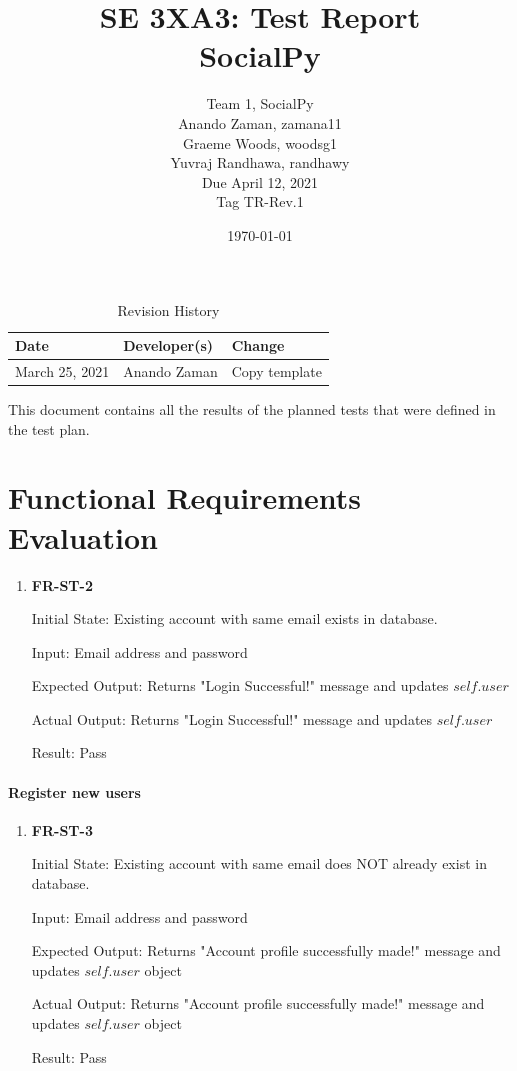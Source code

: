 \documentclass[12pt, titlepage]{article}
\title{SE 3XA3: Test Report\\SocialPy}
\author{
	Team 1, SocialPy
		\\ Anando Zaman, zamana11
        \\ Graeme Woods, woodsg1
        \\ Yuvraj Randhawa, randhawy
        \\ Due April 12, 2021
        \\ Tag TR-Rev.1
}
\date{\today}
\begin{document}
\maketitle

\tableofcontents
\listoftables
\listoffigures

\newpage
\begin{table}[!hbp]
    \caption{Revision History} \label{RevisionHistory}
    \begin{tabularx}{\textwidth}{llX}
        \toprule
            \textbf{Date} & \textbf{Developer(s)} & \textbf{Change}\\
        \midrule
            March 25, 2021 & Anando Zaman & Copy template\\
        \bottomrule
    \end{tabularx}
\end{table}
\newpage


This document contains all the results of the planned tests that were defined in the test plan.

\section{Functional Requirements Evaluation}
\begin{enumerate}

\item{\textbf{FR-ST-2}}

Initial State: Existing account with same email exists in database.
					
Input: Email address and password
					
Expected Output: Returns "Login Successful!" message and updates $self.user$

Actual Output: Returns "Login Successful!" message and updates $self.user$
					
Result: Pass
\end{enumerate}

\paragraph{Register new users}
\begin{enumerate}

\item{\textbf{FR-ST-3}}

Initial State: Existing account with same email does NOT already exist in database.
					
Input: Email address and password
					
Expected Output: Returns "Account profile successfully made!" message and updates $self.user$ object

Actual Output: Returns "Account profile successfully made!" message and updates $self.user$ object
					
Result: Pass
\end{enumerate}
\end{document}
